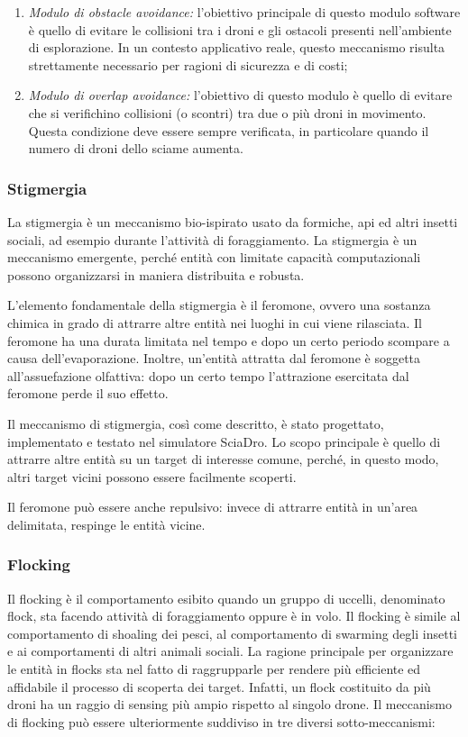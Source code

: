 \begin{enumerate}
    \item \textit{Modulo di obstacle avoidance:} l’obiettivo principale di questo modulo software è quello di evitare le collisioni tra i droni e gli ostacoli presenti nell’ambiente di esplorazione. 
    In un contesto applicativo reale, questo meccanismo risulta strettamente necessario per ragioni di sicurezza e di costi;
    \item \textit{Modulo di overlap avoidance:} l’obiettivo di questo modulo è quello di evitare che si verifichino collisioni (o scontri) tra due o più droni in movimento. 
    Questa condizione deve essere sempre verificata, in particolare quando il numero di droni dello sciame aumenta.
\end{enumerate}

\subsubsection{Stigmergia}

La stigmergia è un meccanismo bio-ispirato usato da formiche, api ed altri insetti sociali, ad esempio durante l’attività di foraggiamento. 
La stigmergia è un meccanismo emergente, perché entità con limitate capacità computazionali possono organizzarsi in maniera distribuita e robusta.

L’elemento fondamentale della stigmergia è il feromone, ovvero una sostanza chimica in grado di attrarre altre entità nei luoghi in cui viene rilasciata. 
Il feromone ha una durata limitata nel tempo e dopo un certo periodo scompare a causa dell’evaporazione. 
Inoltre, un’entità attratta dal feromone è soggetta all’assuefazione olfattiva: dopo un certo tempo l’attrazione esercitata dal feromone perde il suo effetto.

Il meccanismo di stigmergia, così come descritto, è stato progettato, implementato e testato nel simulatore SciaDro. 
Lo scopo principale è quello di attrarre altre entità su un target di interesse comune, perché, in questo modo, altri target vicini possono essere facilmente scoperti.

Il feromone può essere anche repulsivo: invece di attrarre entità in un’area delimitata, respinge le entità vicine.

\subsubsection{Flocking}

Il flocking è il comportamento esibito quando un gruppo di uccelli, denominato flock, sta facendo attività di foraggiamento oppure è in volo. 
Il flocking è simile al comportamento di shoaling dei pesci, al comportamento di swarming degli insetti e ai comportamenti di altri animali sociali. 
La ragione principale per organizzare le entità in flocks sta nel fatto di raggrupparle per rendere più efficiente ed affidabile il processo di scoperta dei target. 
Infatti, un flock costituito da più droni ha un raggio di sensing più ampio rispetto al singolo drone. 
Il meccanismo di flocking può essere ulteriormente suddiviso in tre diversi sotto-meccanismi:

